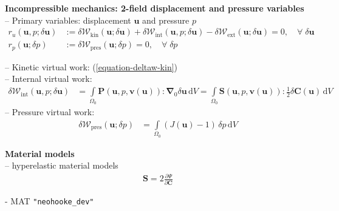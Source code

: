 \documentclass[a4paper,12pt]{report}
\newcommand{\bs}[1]{\boldsymbol{#1}}
\newcommand{\Om}{\mathit{\Omega}}
\begin{document}
\begin{itemize}
\end{itemize}

\textbf{Incompressible mechanics: 2-field displacement and pressure variables}\\

-- Primary variables: displacement $\bs{u}$ and pressure $p$
\begin{equation}
\label{equation-solid-weak-form-inc}
\begin{aligned}
r_u(\bs{u},p;\delta\bs{u}) &:= \delta \mathcal{W}_{\mathrm{kin}}(\bs{u};\delta\bs{u}) + \delta \mathcal{W}_{\mathrm{int}}(\bs{u},p;\delta\bs{u}) - \delta \mathcal{W}_{\mathrm{ext}}(\bs{u};\delta\bs{u}) = 0, \quad \forall \; \delta\bs{u} \\
r_p(\bs{u};\delta p) &:= \delta \mathcal{W}_{\mathrm{pres}}(\bs{u};\delta p) = 0, \quad \forall \; \delta p
\end{aligned}
\end{equation}

-- Kinetic virtual work: (\ref{equation-deltaw-kin})\\
-- Internal virtual work:
\begin{equation}
\label{equation-deltaw-int-inc}
\begin{aligned}
\delta \mathcal{W}_{\mathrm{int}}(\bs{u},p;\delta\bs{u}) &= \int\limits_{\Om_{0}} \bs{P}(\bs{u},p,\bs{v}(\bs{u})) : \bs{\nabla}_{0} \delta\bs{u} \,\mathrm{d}V = \int\limits_{\Om_{0}} \bs{S}(\bs{u},p,\bs{v}(\bs{u})) : \frac{1}{2}\delta\bs{C}(\bs{u}) \,\mathrm{d}V
\end{aligned}
\end{equation}
-- Pressure virtual work:
\begin{equation}
\label{equation-deltaw-p}
\begin{aligned}
\delta \mathcal{W}_{\mathrm{pres}}(\bs{u};\delta p) &= \int\limits_{\Om_{0}} (J(\bs{u}) - 1) \,\delta p \,\mathrm{d}V 
\end{aligned}
\end{equation}


\textbf{Material models}\\
-- hyperelastic material models
\begin{equation}
\begin{aligned}
\bs{S} = 2\frac{\partial\mathit{\Psi}}{\partial \bs{C}}
\end{aligned}
\end{equation}

- MAT \verb."neohooke_dev".\\
\end{document}
